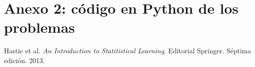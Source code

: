 \documentclass[11pt]{article}
\begin{document}

\section*{Anexo 2: código en Python de los problemas}

\begin{thebibliography}{9}
     Hastie et al. \textit{An Introduction to Statitistical Learning}. Editorial Springer.  Séptima edición. 2013.
\end{thebibliography}
\end{document}
